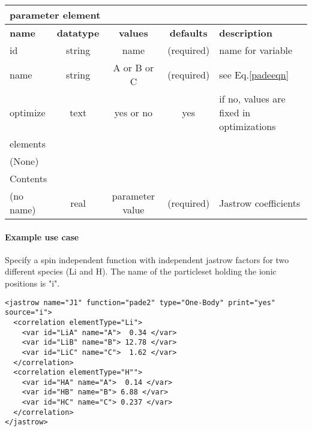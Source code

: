 \begin{table}[h]
\begin{center}
\begin{tabular}{l c c c l }
\hline
\multicolumn{5}{l}{parameter element} \\
\hline
\bfseries name & \bfseries datatype & \bfseries values & \bfseries defaults & \bfseries description \\
\hline
id & string & name & (required) & name for variable \\
name & string & A or B or C & (required) & see Eq.\ref{padeeqn}\\
optimize & text & yes or no & yes & if no, values are fixed in optimizations \\
\hline
\multicolumn{5}{l}{elements}\\ \hline
(None) & & & \\ \hline
\multicolumn{5}{l}{Contents}\\ \hline
 (no name) & real & parameter value & (required) & Jastrow coefficients \\ \hline
\end{tabular}
\end{center}
\end{table}

\paragraph{Example use case}
\label{sec:1bjpadeexamples}

Specify a spin independent function with independent jastrow factors for two different species (Li and H).
The name of the particleset holding the ionic positions is "i".
\begin{lstlisting}[style=QMCPXML]
<jastrow name="J1" function="pade2" type="One-Body" print="yes" source="i">
  <correlation elementType="Li">
    <var id="LiA" name="A">  0.34 </var>
    <var id="LiB" name="B"> 12.78 </var>
    <var id="LiC" name="C">  1.62 </var>
  </correlation>
  <correlation elementType="H"">
    <var id="HA" name="A">  0.14 </var>
    <var id="HB" name="B"> 6.88 </var>
    <var id="HC" name="C"> 0.237 </var>
  </correlation>
</jastrow>
\end{lstlisting}
